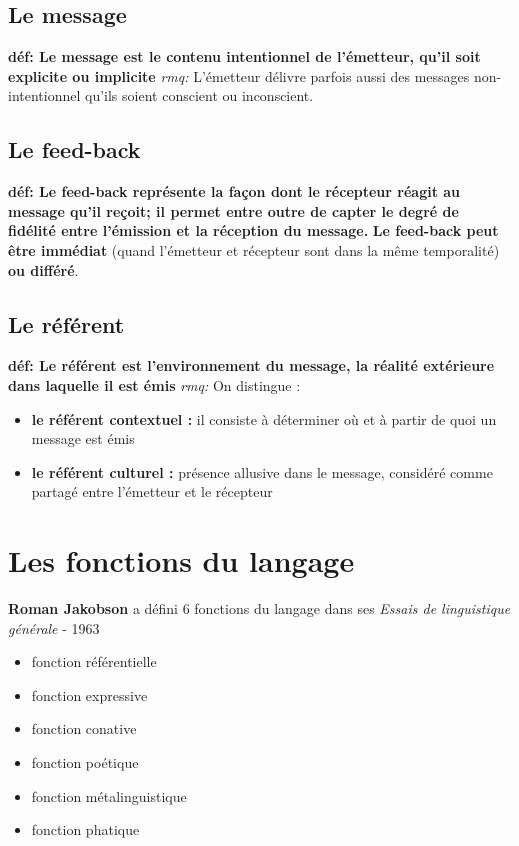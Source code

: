 \documentclass[a4paper,11pt]{report}
\begin{document}
\subsection{Le message}
\textbf{déf: Le message est le contenu intentionnel de l'émetteur, qu'il soit explicite ou implicite}
\textit{rmq:} L'émetteur délivre parfois aussi des messages non-intentionnel qu'ils soient conscient ou inconscient.

\subsection{Le feed-back}
\textbf{déf: Le feed-back représente la façon dont le récepteur réagit au message qu'il reçoit; il permet entre outre de capter le degré de fidélité entre l'émission et la réception du message.}
\textbf{Le feed-back peut être immédiat} (quand l'émetteur et récepteur sont dans la même temporalité) \textbf{ou différé}.

\subsection{Le référent}
\textbf{déf: Le référent est l'environnement du message, la réalité extérieure dans laquelle il est émis}
\textit{rmq:} On distingue :
\begin{itemize}
    \item \textbf{le référent contextuel :} il consiste à déterminer où et à partir de quoi un message est émis
    \item \textbf{le référent culturel :} présence allusive dans le message, considéré comme partagé entre l'émetteur et le récepteur
\end{itemize}
\newpage
\section{Les fonctions du langage}
\textbf{Roman Jakobson} a défini 6 fonctions du langage dans ses \textit{Essais de linguistique générale} - 1963
\begin{itemize}
    \item fonction référentielle
    \item fonction expressive
    \item fonction conative 
    \item fonction poétique
    \item fonction métalinguistique
    \item fonction phatique
\end{itemize}
\end{document}

